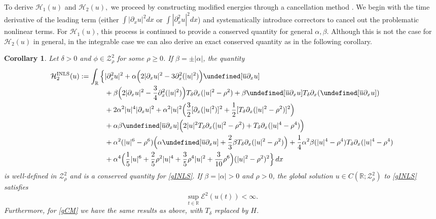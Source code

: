 \documentclass{amsart}
\newtheorem{corollary}[theorem]{Corollary}
\numberwithin{equation}{section}
\newcommand{\Td}{T_{\delta}}
\let\Im=\undefined\DeclareMathOperator{\Im}{Im}
\begin{document}
To derive $\mathcal{H}_1(u)$ and $\mathcal{H}_2(u),$ we proceed by constructing modified energies through a cancellation method \cite{shatah,colliander-kdv}. 
We begin with the time derivative of the leading term (either $\int |\partial_x u|^2 dx$ or $\int |\partial_x^2 u|^2 dx$) and systematically introduce correctors to cancel out the problematic nonlinear terms. 
For $\mathcal{H}_1(u)$, this process is continued to provide a conserved quantity for general $\alpha,\beta$.
Although this is not the case for $\mathcal{H}_2(u)$ in general, in the integrable case we can also derive an exact conserved quantity as in the following corollary.

\begin{corollary}\label{cor:conservation}
Let $\delta>0$ and $\phi\in \mathcal{Z}^2_\rho$ for some $\rho\geq 0$. 
If $\beta =\pm |\alpha|$, the quantity  
\[ \mathcal{H}_2^{\mathrm{INLS}}(u):=\int_{\mathbb{R}} \Big\{ \begin{aligned}[t] &|\partial_x^2u|^2 +\alpha \Big( 2|\partial_xu|^2-3\partial_x^2(|u|^2)\Big) \Im[\overline{u}\partial_xu]  \\
&+\beta \Big( 2|\partial_xu|^2-\frac34\partial_x^2(|u|^2)\Big) \Td\partial_x(|u|^2-\rho^2) +\beta \Im[\overline{u}\partial_xu]\Td\partial_x(\Im[\overline{u}\partial_xu]) \\
&+2\alpha ^2|u|^4|\partial_xu|^2+\alpha ^2|u|^2\Big( \frac32[\partial_x(|u|^2)]^2+\frac12 [\Td\partial_x(|u|^2-\rho^2)]^2\Big) \\
&+\alpha\beta \Im[\overline{u}\partial_xu]\Big( 2|u|^2\Td\partial_x(|u|^2-\rho^2)+ \Td\partial_x(|u|^4-\rho^4)\Big) \\
&+\alpha^2(|u|^6-\rho^6)\Big( \alpha \Im[\overline{u}\partial_xu]+\frac23\beta \Td\partial_x(|u|^2-\rho^2)\Big) +\frac14\alpha^2\beta(|u|^4-\rho^4)\Td\partial_x(|u|^4-\rho^4) \\
&+\alpha^4\Big( \frac15|u|^6+\frac25\rho^2|u|^4+\frac35\rho^4|u|^2+\frac3{10}\rho^6\Big) (|u|^2-\rho^2)^2 \Big\} \,dx \end{aligned} \]
is well-defined in $\mathcal{Z}^2_\rho$ and is a conserved quantity for \eqref{gINLS}.
If $\beta =|\alpha|>0$ and $\rho>0$, the global solution $u\in C(\mathbb{R};\mathcal{Z}^2_{\rho})$ to \eqref{gINLS} satisfies
\begin{equation}\label{GWP-inequality}
\sup_{t\in \mathbb{R}}\mathcal{E}^2(u(t))<\infty.
\end{equation}
Furthermore, for \eqref{gCM} we have the same results as above, with $\Td$ replaced by $H$.
\end{corollary}
\end{document}
